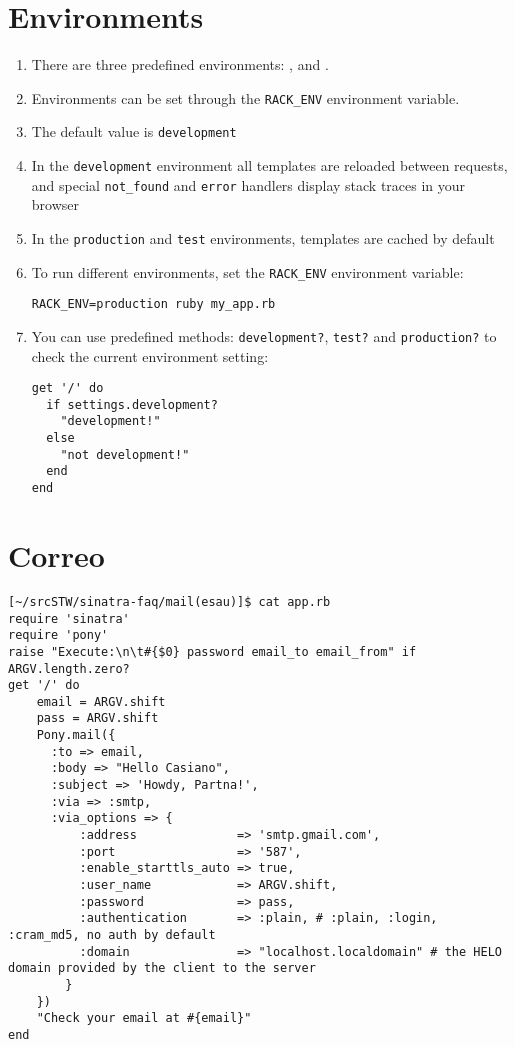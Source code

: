 \section{Environments}
\begin{enumerate}
\item 
There are three predefined environments:
,  and . 

\item 
Environments can be set through the \verb|RACK_ENV| environment variable. 

\item 
The default value is \verb"development"
\item  In the \verb"development" environment all templates are
reloaded between requests, and special \verb|not_found| and 
\verb|error| handlers
display stack traces in your browser
\item  In the \verb"production" and \verb"test" environments, templates are cached by default
\item 
To run different environments, set the \verb|RACK_ENV| environment variable:

\begin{verbatim}
RACK_ENV=production ruby my_app.rb
\end{verbatim}
\item 
You can use predefined methods: \verb|development?|, \verb|test?| 
and \verb|production?| to check the current environment setting:

\begin{verbatim}
get '/' do
  if settings.development?
    "development!"
  else
    "not development!"
  end
end
\end{verbatim}
\end{enumerate}

\section{Correo}
\label{section:correo}
\begin{verbatim}
[~/srcSTW/sinatra-faq/mail(esau)]$ cat app.rb 
require 'sinatra'
require 'pony'
raise "Execute:\n\t#{$0} password email_to email_from" if ARGV.length.zero?
get '/' do
    email = ARGV.shift
    pass = ARGV.shift
    Pony.mail({
      :to => email,
      :body => "Hello Casiano",
      :subject => 'Howdy, Partna!',
      :via => :smtp,
      :via_options => {
          :address              => 'smtp.gmail.com',
          :port                 => '587',
          :enable_starttls_auto => true,
          :user_name            => ARGV.shift,
          :password             => pass,
          :authentication       => :plain, # :plain, :login, :cram_md5, no auth by default
          :domain               => "localhost.localdomain" # the HELO domain provided by the client to the server
        }
    })
    "Check your email at #{email}"
end

\end{verbatim}

